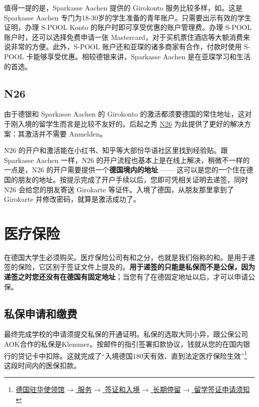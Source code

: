     值得一提的是，Sparkasse Aachen 提供的 Girokonto 服务比较多样，如\href{https://www.sparkasse-aachen.de/de/home/privatkunden/girokonto/s-pool.html}{}。这是 Sparkasse Aachen 专门为18-30岁的学生准备的青年账户。只需要出示有效的学生证明，办理 S-POOL Konto 的账户时即可享受优惠的账户管理费。办理 S-POOL 账户时，还可以选择免费申请一张 Mastercard，对于买机票住酒店等大额消费来说非常的方便。此外，S-POOL 账户还和亚琛的诸多商家有合作，付款时使用 S-POOL 卡能够享受优惠。相较德银来讲，Sparkasse Aachen 是在亚琛学习和生活的首选。

  \subsection{N26}\label{subsec:N26}

    由于德银和 Sparkasse Aachen 的 Girokonto 的激活都须要德国的常住地址，这对于刚入境的留学生而言是比较不友好的。后起之秀 \href{https://n26.com/en-de}{N26} 为此提供了更好的解决方案：其激活并不需要 Anmelden。

    N26 的开户和激活能在小红书、知乎等大部份华语社区里找到经验贴。跟 Sparkasse Aachen 一样，N26 的开户流程也基本上是在线上解决，稍微不一样的一点是，N26 的开户需要提供一个\textbf{德国境内的地址} —— 这可以是您的一个住在德国的朋友的地址。按提示完成了开户手续以后，您即可凭相关证明去递签，同时 N26 会给您的朋友寄送 Girokarte 等证件。入境了德国，从朋友那里拿到了 Girokarte 并修改密码，就算是激活成功了。

\section{医疗保险}\label{sec:医疗保险}

  在德国大学生必须购买。医疗保险公司有和之分，也就是我们俗称的和。是用于递签的保险，它区别于签证文件上提及的。\textbf{用于递签的只能是私保而不是公保，因为递签之时您还没有在德国有固定地址}；当您有了在德固定地址以后，才可以申请公保。

  \subsection{私保申请和缴费}\label{subsec:私保申请和缴费}

    最终完成学校的申请须提交私保的开通证明。私保的选取大同小异，跟公保公司AOK合作的私保是Klemmer。按邮件的指引签署扣款协议，钱就从您的在国内银行的贷记卡中扣除。这就完成了``入境德国180天有效、直到法定医疗保险生效''\footnote{\href{https://china.diplo.de/blob/1341652/cd1526772cd3d64a3f122f07d908a16b/pdf-merkblatt-natvisum-studium-data.pdf}{德国驻华使领馆$\rightarrow$ 服务$\rightarrow$ 签证和入境$\rightarrow$ 长期停留$\rightarrow$ 留学签证申请须知}} 这段时间内的医保扣款。

